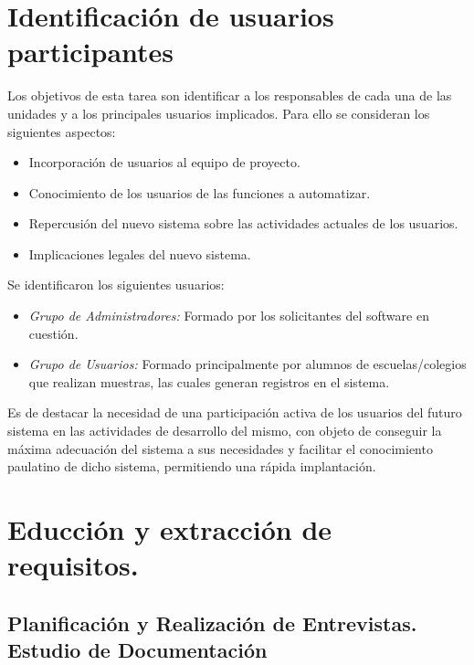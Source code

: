 \section{Identificación de usuarios participantes}

Los objetivos de esta tarea son identificar a los responsables de cada una de las unidades y a los principales usuarios implicados. Para ello se consideran los siguientes aspectos:

\begin{itemize}
    \item Incorporación de usuarios al equipo de proyecto.
    \item Conocimiento de los usuarios de las funciones a automatizar.
    \item Repercusión del nuevo sistema sobre las actividades actuales de los usuarios.
    \item Implicaciones legales del nuevo sistema.
 
\end{itemize}

Se identificaron los siguientes usuarios:

 \begin{itemize}
 
\item \emph{Grupo de Administradores:} Formado por los solicitantes del software en cuestión.
 
\item \emph{Grupo de Usuarios:} Formado principalmente por alumnos de escuelas/colegios que realizan muestras, las cuales generan registros en el sistema.

 \end{itemize}
 
 Es de destacar la necesidad de una participación activa de los usuarios del futuro sistema en las actividades de desarrollo del mismo, con objeto de conseguir la máxima adecuación del sistema a sus necesidades y facilitar el conocimiento paulatino de dicho sistema, permitiendo una rápida implantación.

  \section{Educción y extracción de requisitos.}

  \subsection{Planificación y Realización de Entrevistas. Estudio de Documentación}
  
